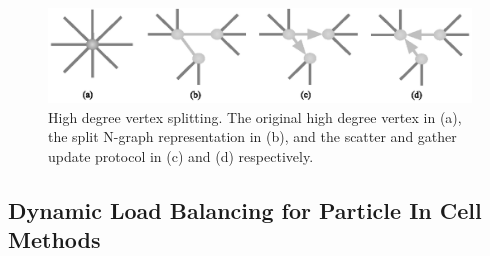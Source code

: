 \documentclass[12pt]{article}
\begin{document}
\begin{figure}
  \includegraphics[width=\textwidth]{vtxSplitting.eps}
  \caption{\label{fig:vtxSplitting}
    High degree vertex splitting. 
    The original high degree vertex in (a), the split N-graph representation in
    (b), and the scatter and gather update protocol in (c) and (d) respectively.
  }
\end{figure}

\subsection{Dynamic Load Balancing for Particle In Cell Methods} 




\end{document}
